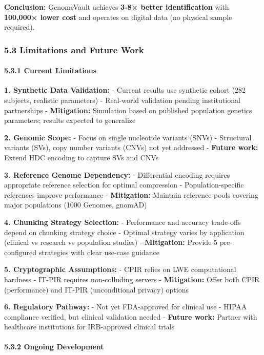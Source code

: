\documentclass[
  11pt,
]{article}
\begin{document}
\textbf{Conclusion:} GenomeVault achieves \textbf{3-8× better
identification} with \textbf{100,000× lower cost} and operates on
digital data (no physical sample required).

\subsubsection{5.3 Limitations and Future
Work}\label{limitations-and-future-work}

\paragraph{5.3.1 Current Limitations}\label{current-limitations}

\textbf{1. Synthetic Data Validation:} - Current results use synthetic
cohort (282 subjects, realistic parameters) - Real-world validation
pending institutional partnerships - \textbf{Mitigation:} Simulation
based on published population genetics parameters; results expected to
generalize

\textbf{2. Genomic Scope:} - Focus on single nucleotide variants (SNVs)
- Structural variants (SVs), copy number variants (CNVs) not yet
addressed - \textbf{Future work:} Extend HDC encoding to capture SVs and
CNVs

\textbf{3. Reference Genome Dependency:} - Differential encoding
requires appropriate reference selection for optimal compression -
Population-specific references improve performance -
\textbf{Mitigation:} Maintain reference pools covering major populations
(1000 Genomes, gnomAD)

\textbf{4. Chunking Strategy Selection:} - Performance and accuracy
trade-offs depend on chunking strategy choice - Optimal strategy varies
by application (clinical vs research vs population studies) -
\textbf{Mitigation:} Provide 5 pre-configured strategies with clear
use-case guidance

\textbf{5. Cryptographic Assumptions:} - CPIR relies on LWE
computational hardness - IT-PIR requires non-colluding servers -
\textbf{Mitigation:} Offer both CPIR (performance) and IT-PIR
(unconditional privacy) options

\textbf{6. Regulatory Pathway:} - Not yet FDA-approved for clinical use
- HIPAA compliance verified, but clinical validation needed -
\textbf{Future work:} Partner with healthcare institutions for
IRB-approved clinical trials

\paragraph{5.3.2 Ongoing Development}\label{ongoing-development}
\end{document}
